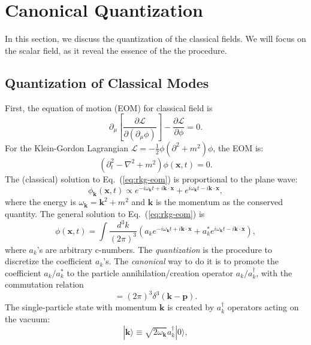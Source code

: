 \documentclass[aps,prb,superscriptaddress,nofootinbib]{revtex4}
\begin{document}
\section{Canonical Quantization}

In this section, we discuss the quantization of the classical fields.
We will focus on the scalar field, as it reveal the essence of the the procedure.


\subsection{Quantization of Classical Modes}
First, the equation of motion (EOM) for classical field is
\begin{equation}
	\partial_\mu \left[\frac{\partial \mathcal L}{\partial(\partial_\mu \phi)}\right] - \frac{\partial \mathcal L}{\partial \phi} = 0.
\end{equation}
For the Klein-Gordon Lagrangian $\mathcal L = -\frac{1}{2}\phi(\partial^2+m^2)\phi$, the EOM is:
\begin{equation}\label{eq:rkg-eom}
	(\partial_t^2-\nabla^2+m^2)\phi(\bm x,t) = 0.
\end{equation}
The (classical) solution to Eq.~(\ref{eq:rkg-eom}) is proportional to the plane wave:
\begin{equation}
	\phi_{\bm k}(\bm x, t) \propto e^{-i\omega_{\bm{k}}t+i\bm{k}\cdot\bm{x}} + e^{i\omega_{\bm{k}}t-i\bm{k}\cdot\bm{x}},
\end{equation}
where the energy is $\omega_{\bm{k}}=\bm{k}^2+m^2$ and $\bm k$ is the momentum as the conserved quantity.
The general solution to Eq.~(\ref{eq:rkg-eom}) is
\begin{equation}
	\phi(\bm x,t) = \int \frac{d^{3} k}{(2\pi)^{3}} \left(
		a_{k}e^{-i\omega_{\bm{k}}t+i\bm{k}\cdot\bm{x}} + 
		a^*_{k}e^{i\omega_{\bm{k}}t-i\bm{k}\cdot\bm{x}} 
	\right),
\end{equation}
where $a_k$'s are arbitrary c-numbers.
The \textit{quantization} is the procedure to discretize the coefficient $a_k$'s.
The \textit{canonical} way to do it is to promote the coefficient $a_{k}/a_{k}^*$ to the particle annihilation/creation operator $a_{k}/a_{k}^\dagger$, with the commutation relation
\begin{equation}
	[a_{k}, a_{p}^\dagger] = (2\pi)^{3} \delta^{3}(\bm{k}-\bm{p}).
\end{equation}
The single-particle state with momentum $\bm k$ is created by $a_{k}^{\dagger}$ operators acting on the vacuum:
\begin{equation}
	|\bm{k}\rangle \equiv \sqrt{2\omega_{\bm k}} a_{k}^{\dagger}|0\rangle,
	\label{eq:rel-single-particle}
\end{equation}
\end{document}
